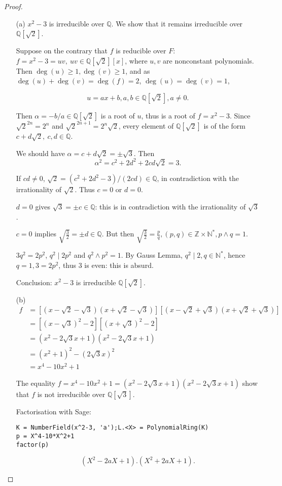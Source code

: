 \documentclass[11pt,a4paper]{article}
\begin{document}
\begin{proof}
\begin{enumerate}
\item[(a)]$x^2-3$ is irreducible over $\mathbb{Q}$. We show that it remains irreducible over $\mathbb{Q}[\sqrt{2}]$.

Suppose on the contrary that $f$ is reducible over $F$:  $f = x^2 - 3 = u v,\ u v \in \mathbb{Q}[\sqrt{2}][x]$, where $u,v$ are nonconstant polynomials. Then $\deg(u)\geq 1, \deg(v) \geq 1$, and as $\deg(u) + \deg(v) = \deg(f) = 2$, $\deg(u) = \deg(v)=1$, 

$$u = ax+b, a,b\in \mathbb{Q}[\sqrt{2}], a\neq 0.$$

Then $\alpha = -b/a \in \mathbb{Q}[\sqrt{2}]$ is a root of $u$, thus is a root of $f = x^2-3$. Since $\sqrt{2}^{2n} = 2^n$ and $\sqrt{2}^{2n+1} = 2^n \sqrt{2}$, every element of $\mathbb{Q}[\sqrt{2}]$  is of the form $c+ d\sqrt{2} , \ c,d \in \mathbb{Q}$.

We should have $\alpha = c + d \sqrt{2} = \pm \sqrt{3}. $
Then $$\alpha^2 = c^2+2d^2  +2cd\sqrt{2}=3.$$

If $cd\neq 0$, $\sqrt{2} = (c^2+2d^2 -3)/(2cd) \in \mathbb{Q}$, in contradiction with the irrationality of $\sqrt{2}$. Thus $c=0$ or $d=0$.

$d=0$ gives $\sqrt{3} = \pm c \in \mathbb{Q}$: this is in contradiction with the irrationality of $\sqrt{3}$.

$c=0$ implies $\sqrt{\frac{3}{2}} = \pm d \in \mathbb{Q}$. But then $\sqrt{\frac{3}{2}} =\frac{p}{q}, (p,q) \in \mathbb{Z} \times \mathbb{N}^*, p\wedge q=1$.

$3q^2 = 2 p^2$, $q^2 \mid 2 p^2$ and $q^2 \wedge p^2 = 1$. By Gauss Lemma, $q^2 \mid 2, q\in \mathbb{N}^*$, hence $q=1, 3 = 2p^2$, thus $3$ is even: this is absurd.

Conclusion: $x^2-3$ is irreducible $\mathbb{Q}[\sqrt{2}]$.


\item[(b)]
\begin{align*}
 f&= [(x-\sqrt{2} - \sqrt{3})(x+\sqrt{2} -\sqrt{3})] [(x-\sqrt{2} + \sqrt{3})(x+\sqrt{2} + \sqrt{3})]\\
&=[(x-\sqrt{3})^2-2][(x+\sqrt{3})^2-2]\\
&= (x^2 -2\sqrt{3} x +1)(x^2 -2\sqrt{3} x +1)\\
&= (x^2+1)^2 - (2\sqrt{3}x)^2\\
&=x^4 -10x^2 +1
\end{align*}

The equality $f = x^4 -10x^2 +1 = (x^2 -2\sqrt{3} x +1)(x^2 -2\sqrt{3} x +1)$ show that $f$ is not irreducible over $\mathbb{Q}[\sqrt{3}]$.

{\bigskip}

Factorisation with Sage:
\begin{verbatim}
K = NumberField(x^2-3, 'a');L.<X> = PolynomialRing(K)
p = X^4-10*X^2+1
factor(p)
\end{verbatim}
$$(X^2-2aX+1).(X^2+2aX+1).$$
\end{enumerate}
\end{proof}
\end{document}
